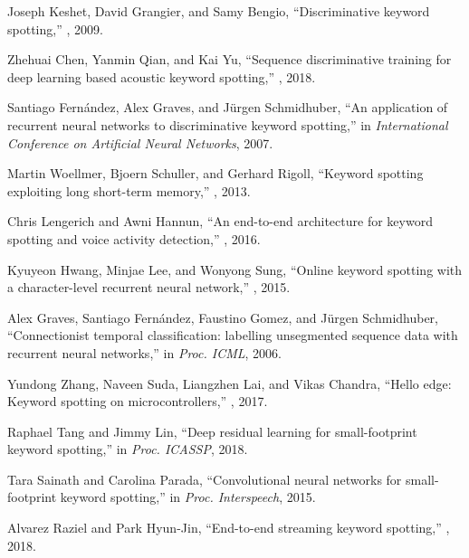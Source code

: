 \documentclass{article}
\begin{document}
\begin{thebibliography}{10}
Joseph Keshet, David Grangier, and Samy Bengio,
\newblock ``Discriminative keyword spotting,''
, 2009.

Zhehuai Chen, Yanmin Qian, and Kai Yu,
\newblock ``Sequence discriminative training for deep learning based acoustic
  keyword spotting,''
, 2018.

Santiago Fern{\'a}ndez, Alex Graves, and J{\"u}rgen Schmidhuber,
\newblock ``An application of recurrent neural networks to discriminative
  keyword spotting,''
\newblock in {\em International Conference on Artificial Neural Networks},
  2007.

Martin Woellmer, Bjoern Schuller, and Gerhard Rigoll,
\newblock ``Keyword spotting exploiting long short-term memory,''
, 2013.

Chris Lengerich and Awni Hannun,
\newblock ``An end-to-end architecture for keyword spotting and voice activity
  detection,''
, 2016.

Kyuyeon Hwang, Minjae Lee, and Wonyong Sung,
\newblock ``Online keyword spotting with a character-level recurrent neural
  network,''
, 2015.

Alex Graves, Santiago Fern{\'a}ndez, Faustino Gomez, and J{\"u}rgen
  Schmidhuber,
\newblock ``Connectionist temporal classification: labelling unsegmented
  sequence data with recurrent neural networks,''
\newblock in {\em Proc. ICML}, 2006.

Yundong Zhang, Naveen Suda, Liangzhen Lai, and Vikas Chandra,
\newblock ``Hello edge: Keyword spotting on microcontrollers,''
, 2017.

Raphael Tang and Jimmy Lin,
\newblock ``Deep residual learning for small-footprint keyword spotting,''
\newblock in {\em Proc. ICASSP}, 2018.

Tara Sainath and Carolina Parada,
\newblock ``Convolutional neural networks for small-footprint keyword
  spotting,''
\newblock in {\em Proc. Interspeech}, 2015.

Alvarez Raziel and Park Hyun-Jin,
\newblock ``End-to-end streaming keyword spotting,''
, 2018.


\end{thebibliography}
\end{document}
